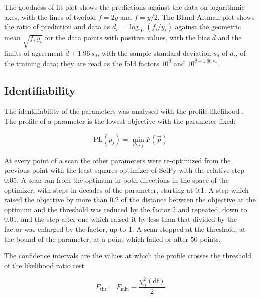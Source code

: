 The goodness of fit plot shows the predictions against the data on logarithmic axes, with the lines of twofold $f = 2y$ and $f = y/2$. The Bland-Altman plot \cite{Bland1986} shows the ratio of prediction and data as $d_i = \log_{10}(f_i / y_i)$ against the geometric mean $\sqrt{f_i\, y_i}$ for the data points with positive values, with the bias $\overline{d}$ and the limits of agreement $\overline{d} \pm 1.96\, s_d$, with the sample standard deviation $s_d$ of $d_i$, of the training data; they are read as the fold factors $10^{\overline{d}}$ and $10^{\overline{d} \pm 1.96\, s_d}$.

\subsection{Identifiability}

The identifiability of the parameters was analysed with the profile likelihood \cite{Raue2009,Kreutz2013}. The profile of a parameter is the lowest objective with the parameter fixed:

\begin{equation}
\mathrm{PL}(p_j) = \min_{p_{l \neq j}} F(\vec{p})
\end{equation}

At every point of a scan the other parameters were re-optimized from the previous point with the least squares optimizer of SciPy with the relative step 0.05. A scan ran from the optimum in both directions in the space of the optimizer, with steps in decades of the parameter, starting at 0.1. A step which raised the objective by more than 0.2 of the distance between the objective at the optimum and the threshold was reduced by the factor 2 and repeated, down to 0.01, and the step after one which raised it by less than that divided by the factor was enlarged by the factor, up to 1. A scan stopped at the threshold, at the bound of the parameter, at a point which failed or after 50 points.

The confidence intervals are the values at which the profile crosses the threshold of the likelihood ratio test

\begin{equation}
F_{\mathrm{thr}} = F_{\min} + \frac{\chi^2_{\alpha}(\mathrm{df})}{2}
\end{equation}

